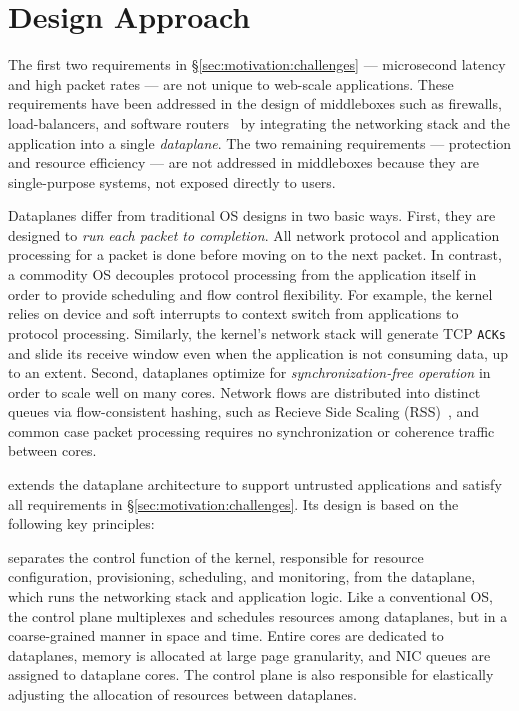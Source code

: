 \section{\ix Design Approach}
\label{sec:design}

The first two requirements in \S\ref{sec:motivation:challenges} ---
microsecond latency and high packet rates --- are not unique to
web-scale applications. These requirements have been addressed in the
design of middleboxes such as firewalls, load-balancers, and software
routers~\cite{routebricks,click} by integrating the networking stack
and the application into a single \emph{dataplane}. The two remaining
requirements --- protection and resource efficiency --- are not
addressed in middleboxes because they are single-purpose systems, not
exposed directly to users.

Dataplanes differ from traditional OS designs in two basic
ways. First, they are designed to \emph{run each packet to
  completion}. All network protocol and application processing for a
packet is done before moving on to the next packet.  In contrast, a
commodity OS decouples protocol processing from the application itself
in order to provide scheduling and flow control flexibility.  For
example, the kernel relies on device and soft interrupts to context
switch from applications to protocol processing. Similarly, the
kernel's network stack will generate TCP \texttt{ACKs} and slide its
receive window even when the application is not consuming data, up to
an extent. Second, dataplanes optimize for \emph{synchronization-free
  operation} in order to scale well on many cores. Network flows are
distributed into distinct queues via flow-consistent hashing, such as
Recieve Side Scaling (RSS)~\cite{url:rss}, and common case packet processing requires no
synchronization or coherence traffic between cores.

\ix extends the dataplane architecture to support untrusted
applications and satisfy all requirements in
\S\ref{sec:motivation:challenges}. Its design is based on the
following key principles:


 \ix
separates the control function of the kernel, responsible for resource
configuration, provisioning, scheduling, and monitoring, from the
dataplane, which runs the networking stack and application logic.
Like a conventional OS, the control plane multiplexes and schedules
resources among dataplanes, but in a coarse-grained manner in space
and time. Entire cores are dedicated to dataplanes, memory is
allocated at large page granularity, and NIC queues are assigned to
dataplane cores. The control plane is also responsible for elastically
adjusting the allocation of resources between dataplanes.

